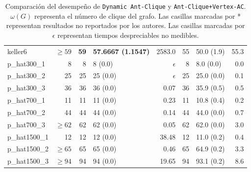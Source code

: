 \documentclass[conference]{IEEEtran}
\begin{document}
\begin{center}
\begin{table}[ht]
{\begin{tabular}{lr|rlr|rlr}
 keller6           &    $\geq 59$  &  \textbf{59}  &  \textbf{57.6667 (1.1547)}  &       2583.0  &    55  &  50.0 (1.9)     &        55.3  \\
 p\_hat300\_1      &            8  &            8  &  8 (0.0)                    &   $\epsilon$  &     8  &  8.0 (0.0)      &         0.0  \\
 p\_hat300\_2      &           25  &           25  &  25 (0.0)                   &   $\epsilon$  &    25  &  25.0 (0.0)     &         0.1  \\
 p\_hat300\_3      &           36  &           36  &  36 (0.0)                   &         0.07  &    36  &  35.9 (0.5)     &         0.5  \\
 p\_hat700\_1      &           11  &           11  &  11 (0.0)                   &         0.23  &    11  &  10.8 (0.4)     &         0.2  \\
 p\_hat700\_2      &           44  &           44  &  44 (0.0)                   &         0.14  &    44  &  44.0 (0.0)     &         0.7  \\
 p\_hat700\_3      &    $\geq 62$  &           62  &  62 (0.0)                   &         0.05  &    62  &  62.0 (0.0)     &         3.0  \\
 p\_hat1500\_1     &           12  &           12  &  12 (0.0)                   &        38.48  &    12  &  11.0 (0.2)     &         0.4  \\
 p\_hat1500\_2     &    $\geq 65$  &           65  &  65 (0.0)                   &         0.46  &    65  &  64.9 (0.2)     &         3.3  \\
 p\_hat1500\_3     &    $\geq 94$  &           94  &  94 (0.0)                   &        19.65  &    94  &  93.1 (0.2)     &         8.6  \\
\hline
\end{tabular}}
\hfill{}
\caption{Comparación del desempeño de \texttt{Dynamic Ant-Clique} y
  \texttt{Ant-Clique+Vertex-AC}. $\omega(G)$ representa el número de
  clique del grafo. Las casillas marcadas por * representan resultados
no reportados por los autores. Las casillas marcadas por $\epsilon$
representan tiempos despreciables no medibles.}
\label{tb:aco}
\end{table}
\end{center}
\end{document}
